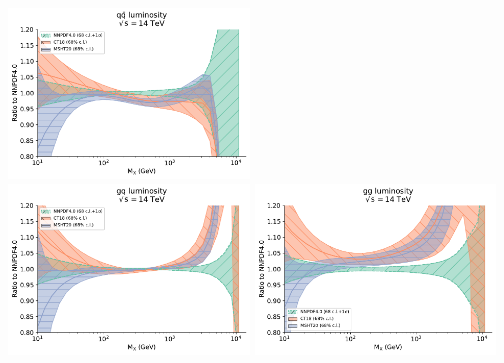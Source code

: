 \documentclass{beamer}
\begin{document}
\begin{frame}
\begin{overlayarea}{\textwidth}{10cm}
{   \includegraphics[width=0.48\textwidth]{plots/lumi_qqbar_2}\\
   \includegraphics[width=0.48\textwidth]{plots/lumi_gq_2}
   \includegraphics[width=0.48\textwidth]{plots/lumi_gg_2}\\  
  }
 \end{overlayarea}
\end{frame}
\end{document}
